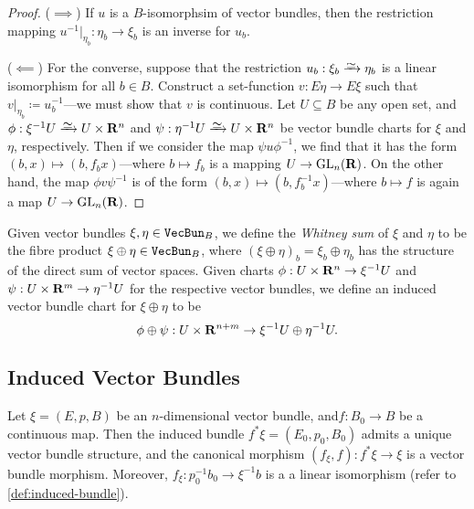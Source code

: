 \documentclass[../../../deep-dive]{subfile}
\begin{document}
\begin{proof}
(\(\implies\)) If \(u\) is a \(B\)-isomorphsim of vector bundles, then the
restriction mapping \(u^{-1}|_{\eta_b}: \eta_b \to \xi_b\) is an inverse for
\(u_b\).

(\(\impliedby\)) For the converse, suppose that the restriction
\(u_b: \xi_b \isoto \eta_b\) is a linear isomorphism for all \(b \in
B\). Construct a set-function \(v: E \eta \to E \xi\) such that
\(v|_{\eta_b} \coloneq u_b^{-1}\)---we must show that \(v\) is continuous. Let
\(U \subseteq B\) be any open set, and \(\phi: \xi^{-1} U \isoto U \times \R^n\)
and \(\psi: \eta^{-1} U \isoto U \times \R^n\) be vector bundle charts for
\(\xi\) and \(\eta\), respectively. Then if we consider the map
\(\psi u \phi^{-1}\), we find that it has the form
\((b, x) \mapsto (b, f_b x)\)---where \(b \mapsto f_b\) is a mapping
\(U \to \operatorname{GL}_n(\mathbf{R})\). On the other hand, the map \(\phi v \psi^{-1}\) is of the
form \((b, x) \mapsto (b, f_b^{-1} x)\)---where \(b \mapsto f\) is again a map
\(U \to \operatorname{GL}_n(\mathbf{R})\).
\end{proof}

\begin{definition}
\label{def:whitney-sum}
Given vector bundles \(\xi, \eta \in {\texttt{VecBun}}_B\), we define the \emph{Whitney
  sum} of \(\xi\) and \(\eta\) to be the fibre product
\(\xi \oplus \eta \in {\texttt{VecBun}}_B\), where
\((\xi \oplus \eta)_b = \xi_b \oplus \eta_b\) has the structure of the direct
sum of vector spaces. Given charts \(\phi: U \times \mathbf{R}^n \to \xi^{-1} U\) and
\(\psi: U \times \mathbf{R}^m \to \eta^{-1} U\) for the respective vector bundles, we
define an induced vector bundle chart for \(\xi \oplus \eta\) to be
\[
\phi \oplus \psi: U \times \mathbf{R}^{n+m} \to \xi^{-1} U \oplus \eta^{-1} U.
\]

\end{definition}

\subsection{Induced Vector Bundles}

\begin{proposition}
\label{prop:induced-vector-bundle}
Let \(\xi = (E, p, B)\) be an \(n\)-dimensional vector bundle,
and\(f: B_0 \to B\) be a continuous map. Then the induced bundle
\(f^{*} \xi = (E_0, p_0, B_0)\) admits a unique vector bundle structure, and the
canonical morphism \((f_{\xi}, f): f^{*} \xi \to \xi\) is a vector bundle
morphism. Moreover, \(f_{\xi}: p_0^{-1} b_0 \to \xi^{-1} b\) is a a linear
isomorphism (refer to \cref{def:induced-bundle}).
\end{proposition}
\end{document}
